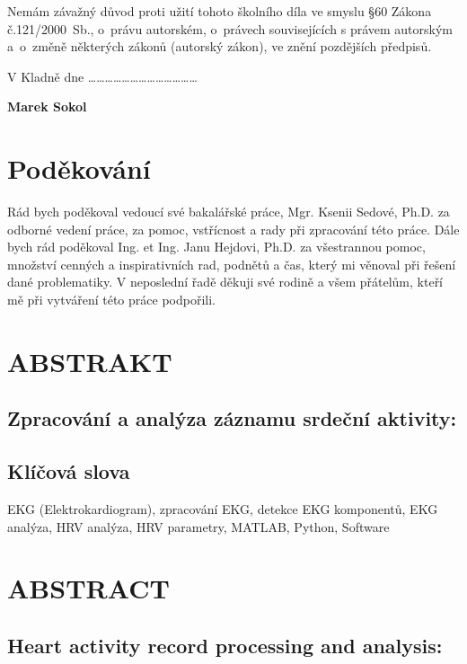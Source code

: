\documentclass[a4paper,12pt,czech]{article}   %
\numberwithin{equation}{section}        %
\newcommand{\autor}{Marek Sokol}
\newcommand{\nazev}{Zpracování a analýza záznamu srdeční aktivity}
\newcommand{\nazevENG}{Heart activity record processing and analysis}
\begin{document}
\hspace{-0.75cm}Nemám závažný důvod proti užití tohoto školního díla ve smyslu \S 60 Zákona č.121/2000~Sb., o~právu autorském, o~právech souvisejících s právem autorským a~o~změně některých zákonů (autorský zákon), ve znění pozdějších předpisů.

\vspace{1em}

\hspace{-0.75cm}V Kladně dne \ldots \ldots \ldots \hfill \ldots \ldots \ldots \ldots \ldots \ldots \ldots \ldots \ldots \ldots

\hspace{10cm} \textbf{\autor}

\clearpage

\null\vfill
\section*{Poděkování}
Rád bych poděkoval vedoucí své bakalářské práce, Mgr. Ksenii Sedové, Ph.D. za
odborné vedení práce, za pomoc, vstřícnost a rady při zpracování této práce.
Dále bych rád poděkoval Ing. et Ing. Janu Hejdovi, Ph.D. za všestrannou
pomoc, množství cenných a inspirativních rad, podnětů a čas, který
mi věnoval při řešení dané problematiky. V neposlední řadě děkuji své rodině a
všem přátelům, kteří mě při vytváření této práce podpořili.

\clearpage


\null\vfill
\section*{ABSTRAKT}
\subsection*{\nazev:}

\subsection*{Klíčová slova}
EKG (Elektrokardiogram), zpracování EKG, detekce EKG komponentů, EKG analýza, HRV analýza, HRV parametry, MATLAB, Python, Software
\clearpage


\null\vfill
\section*{ABSTRACT}
\subsection*{\nazevENG:}

\end{document}
